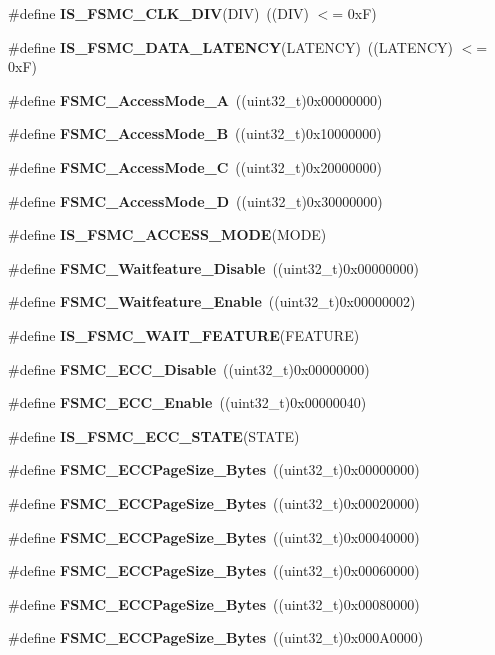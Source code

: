 \begin{DoxyCompactItemize}
\#define \textbf{ I\+S\+\_\+\+F\+S\+M\+C\+\_\+\+C\+L\+K\+\_\+\+D\+IV}(D\+IV)~((D\+IV) $<$= 0x\+F)
\item 
\#define \textbf{ I\+S\+\_\+\+F\+S\+M\+C\+\_\+\+D\+A\+T\+A\+\_\+\+L\+A\+T\+E\+N\+CY}(L\+A\+T\+E\+N\+CY)~((L\+A\+T\+E\+N\+CY) $<$= 0x\+F)
\item 
\#define \textbf{ F\+S\+M\+C\+\_\+\+Access\+Mode\+\_\+A}~((uint32\+\_\+t)0x00000000)
\item 
\#define \textbf{ F\+S\+M\+C\+\_\+\+Access\+Mode\+\_\+B}~((uint32\+\_\+t)0x10000000)
\item 
\#define \textbf{ F\+S\+M\+C\+\_\+\+Access\+Mode\+\_\+C}~((uint32\+\_\+t)0x20000000)
\item 
\#define \textbf{ F\+S\+M\+C\+\_\+\+Access\+Mode\+\_\+D}~((uint32\+\_\+t)0x30000000)
\item 
\#define \textbf{ I\+S\+\_\+\+F\+S\+M\+C\+\_\+\+A\+C\+C\+E\+S\+S\+\_\+\+M\+O\+DE}(M\+O\+DE)
\item 
\#define \textbf{ F\+S\+M\+C\+\_\+\+Waitfeature\+\_\+\+Disable}~((uint32\+\_\+t)0x00000000)
\item 
\#define \textbf{ F\+S\+M\+C\+\_\+\+Waitfeature\+\_\+\+Enable}~((uint32\+\_\+t)0x00000002)
\item 
\#define \textbf{ I\+S\+\_\+\+F\+S\+M\+C\+\_\+\+W\+A\+I\+T\+\_\+\+F\+E\+A\+T\+U\+RE}(F\+E\+A\+T\+U\+RE)
\item 
\#define \textbf{ F\+S\+M\+C\+\_\+\+E\+C\+C\+\_\+\+Disable}~((uint32\+\_\+t)0x00000000)
\item 
\#define \textbf{ F\+S\+M\+C\+\_\+\+E\+C\+C\+\_\+\+Enable}~((uint32\+\_\+t)0x00000040)
\item 
\#define \textbf{ I\+S\+\_\+\+F\+S\+M\+C\+\_\+\+E\+C\+C\+\_\+\+S\+T\+A\+TE}(S\+T\+A\+TE)
\item 
\#define \textbf{ F\+S\+M\+C\+\_\+\+E\+C\+C\+Page\+Size\+\_\+Bytes}~((uint32\+\_\+t)0x00000000)
\item 
\#define \textbf{ F\+S\+M\+C\+\_\+\+E\+C\+C\+Page\+Size\+\_\+Bytes}~((uint32\+\_\+t)0x00020000)
\item 
\#define \textbf{ F\+S\+M\+C\+\_\+\+E\+C\+C\+Page\+Size\+\_\+Bytes}~((uint32\+\_\+t)0x00040000)
\item 
\#define \textbf{ F\+S\+M\+C\+\_\+\+E\+C\+C\+Page\+Size\+\_\+Bytes}~((uint32\+\_\+t)0x00060000)
\item 
\#define \textbf{ F\+S\+M\+C\+\_\+\+E\+C\+C\+Page\+Size\+\_\+Bytes}~((uint32\+\_\+t)0x00080000)
\item 
\#define \textbf{ F\+S\+M\+C\+\_\+\+E\+C\+C\+Page\+Size\+\_\+Bytes}~((uint32\+\_\+t)0x000\+A0000)

\end{DoxyCompactItemize}
